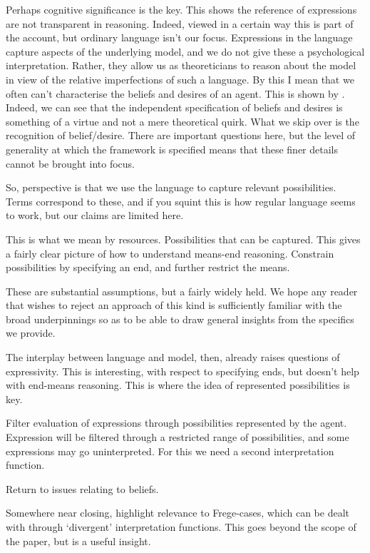 \documentclass[10pt]{article}
\begin{document}
Perhaps cognitive significance is the key.
This shows the reference of expressions are not transparent in reasoning.
Indeed, viewed in a certain way this is part of the account, but ordinary language isn't our focus.
Expressions in the language capture aspects of the underlying model, and we do not give these a psychological interpretation.
Rather, they allow us as theoreticians to reason about the model in view of the relative imperfections of such a language.
By this I mean that we often can't characterise the beliefs and desires of an agent.
This is shown by \citeauthor{Humberstone:2013aa}.
Indeed, we can see that the independent specification of beliefs and desires is something of a virtue and not a mere theoretical quirk.
What we skip over is the recognition of belief/desire.
There are important questions here, but the level of generality at which the framework is specified means that these finer details cannot be brought into focus.

So, perspective is that we use the language to capture relevant possibilities.
Terms correspond to these, and if you squint this is how regular language seems to work, but our claims are limited here.

This is what we mean by resources.
Possibilities that can be captured.
This gives a fairly clear picture of how to understand means-end reasoning.
Constrain possibilities by specifying an end, and further restrict the means.

These are substantial assumptions, but a fairly widely held.
We hope any reader that wishes to reject an approach of this kind is sufficiently familiar with the broad underpinnings so as to be able to draw general insights from the specifics we provide.

The interplay between language and model, then, already raises questions of expressivity.
This is interesting, with respect to specifying ends, but doesn't help with end-means reasoning.
This is where the idea of represented possibilities is key.

Filter evaluation of expressions through possibilities represented by the agent.
Expression will be filtered through a restricted range of possibilities, and some expressions may go uninterpreted.
For this we need a second interpretation function.

Return to issues relating to beliefs.








Somewhere near closing, highlight relevance to Frege-cases, which can be dealt with through `divergent' interpretation functions.
This goes beyond the scope of the paper, but is a useful insight.
\end{document}
